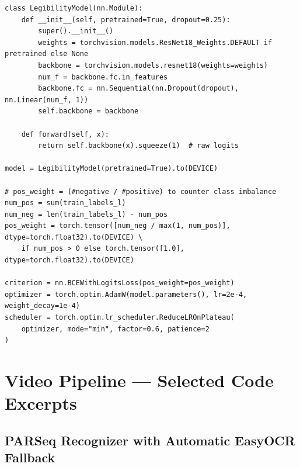 \begin{lstlisting}[caption={\texttt{LegibilityModel} --- ResNet-18 binary legibility classifier with class-imbalance-weighted BCE loss and the \texttt{ReduceLROnPlateau} scheduler configuration (factor 0.6) used in Section~\ref{sec:legibility-training}.}]
class LegibilityModel(nn.Module):
    def __init__(self, pretrained=True, dropout=0.25):
        super().__init__()
        weights = torchvision.models.ResNet18_Weights.DEFAULT if pretrained else None
        backbone = torchvision.models.resnet18(weights=weights)
        num_f = backbone.fc.in_features
        backbone.fc = nn.Sequential(nn.Dropout(dropout), nn.Linear(num_f, 1))
        self.backbone = backbone

    def forward(self, x):
        return self.backbone(x).squeeze(1)  # raw logits

model = LegibilityModel(pretrained=True).to(DEVICE)

# pos_weight = (#negative / #positive) to counter class imbalance
num_pos = sum(train_labels_l)
num_neg = len(train_labels_l) - num_pos
pos_weight = torch.tensor([num_neg / max(1, num_pos)], dtype=torch.float32).to(DEVICE) \
    if num_pos > 0 else torch.tensor([1.0], dtype=torch.float32).to(DEVICE)

criterion = nn.BCEWithLogitsLoss(pos_weight=pos_weight)
optimizer = torch.optim.AdamW(model.parameters(), lr=2e-4, weight_decay=1e-4)
scheduler = torch.optim.lr_scheduler.ReduceLROnPlateau(
    optimizer, mode="min", factor=0.6, patience=2
)
\end{lstlisting}

\section{Video Pipeline --- Selected Code Excerpts}
\label{sec:appx-video-code}

\subsection{PARSeq Recognizer with Automatic EasyOCR Fallback}

